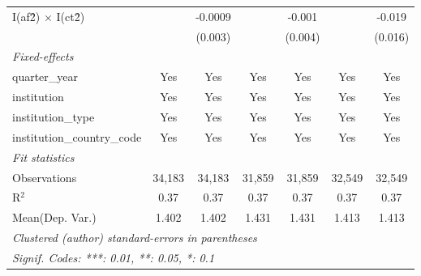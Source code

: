 \begin{tabular}{lcccccc}
   I(af\^2) $\times$ I(ct\^2)         &               & -0.0009        &               & -0.001         &               & -0.019\\   
                                      &               & (0.003)        &               & (0.004)        &               & (0.016)\\   
   \midrule
   \emph{Fixed-effects}\\
   quarter\_year                      & Yes           & Yes            & Yes           & Yes            & Yes           & Yes\\  
   institution                        & Yes           & Yes            & Yes           & Yes            & Yes           & Yes\\  
   institution\_type                  & Yes           & Yes            & Yes           & Yes            & Yes           & Yes\\  
   institution\_country\_code         & Yes           & Yes            & Yes           & Yes            & Yes           & Yes\\  
   \midrule
   \emph{Fit statistics}\\
   Observations                       & 34,183        & 34,183         & 31,859        & 31,859         & 32,549        & 32,549\\  
   R$^2$                              & 0.37          & 0.37           & 0.37          & 0.37           & 0.37          & 0.37\\  
Mean(Dep. Var.) & 1.402 & 1.402 & 1.431 & 1.431 & 1.413 & 1.413 \\
   \midrule \midrule
   \multicolumn{7}{l}{\emph{Clustered (author) standard-errors in parentheses}}\\
   \multicolumn{7}{l}{\emph{Signif. Codes: ***: 0.01, **: 0.05, *: 0.1}}\\
\end{tabular}
\par\endgroup
